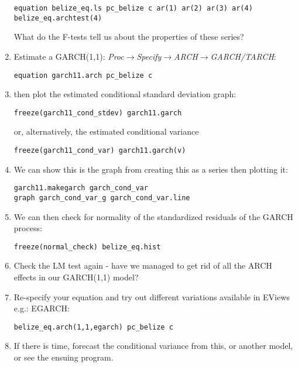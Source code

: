 \documentclass[a4paper,11pt]{article}
\begin{document}
\begin{enumerate}
\begin{center}
\texttt{equation belize\_eq.ls pc\_belize c ar(1) ar(2) ar(3) ar(4)\\
belize\_eq.archtest(4)}
\end{center}
What do the F-tests tell us about the properties of these series?
\item Estimate a GARCH(1,1): \emph{Proc}$\rightarrow$\emph{Specify}$\rightarrow$\emph{ARCH}$\rightarrow$\emph{GARCH/TARCH}:
\begin{center}
\texttt{equation garch11.arch pc\_belize c}
\end{center}
\item then plot the estimated conditional standard deviation graph:
\begin{center}
\texttt{freeze(garch11\_cond\_stdev) garch11.garch}
\end{center}
or, alternatively, the estimated conditional variance
\begin{center}
\texttt{freeze(garch11\_cond\_var) garch11.garch(v)}
\end{center}
\item We can show this is the graph from creating this as a series then plotting it:
\begin{center}
\texttt{garch11.makegarch garch\_cond\_var\\
graph garch\_cond\_var\_g garch\_cond\_var.line}
\end{center}
\item We can then check for normality of the standardized residuals of the GARCH process:
\begin{center}
\texttt{freeze(normal\_check) belize\_eq.hist}
\end{center}
\item Check the LM test again - have we managed to get rid of all the ARCH effects in our GARCH(1,1) model?
\item Re-specify your equation and try out different variations available in EViews e.g.: EGARCH:
\begin{center}
\texttt{belize\_eq.arch(1,1,egarch) pc\_belize c}
\end{center}
\item If there is time, forecast the conditional variance from this, or another model, or see the ensuing program.
\end{enumerate}


\newpage
\end{document}
